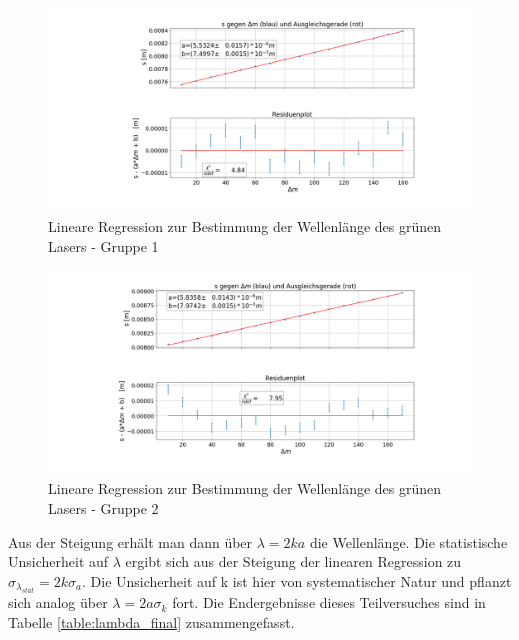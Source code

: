 \documentclass[a4paper, 11pt]{article}
\begin{document}
\begin{figure}[H]
	\centering
	\includegraphics[trim={8cm 1cm 1cm 1cm},clip=true,width=1.1\linewidth]{./Bilder/Wellenlaengenbestimmung_1.png}
	\caption{Lineare Regression zur Bestimmung der Wellenlänge des grünen Lasers - Gruppe 1}
	\label{pic:lambda_1}	
\end{figure}

\begin{figure}[H]
	\centering
	\includegraphics[trim={8cm 1cm 1cm 1cm},clip=true,width=1.1\linewidth]{./Bilder/Wellenlaengenbestimmung_2.png}
	\caption{Lineare Regression zur Bestimmung der Wellenlänge des grünen Lasers - Gruppe 2}
	\label{pic:lambda_2}	
\end{figure}

Aus der Steigung erhält man dann über $\lambda = 2 k a$ die Wellenlänge. Die statistische Unsicherheit auf $\lambda$ ergibt sich aus der Steigung der linearen Regression zu $\sigma_{\lambda_{stat}} = 2k\sigma_a$. Die Unsicherheit auf k ist hier von systematischer Natur und pflanzt sich analog über $\lambda = 2a \sigma_k$ fort. Die Endergebnisse dieses Teilversuches sind in Tabelle \ref{table:lambda_final} zusammengefasst.
\end{document}
